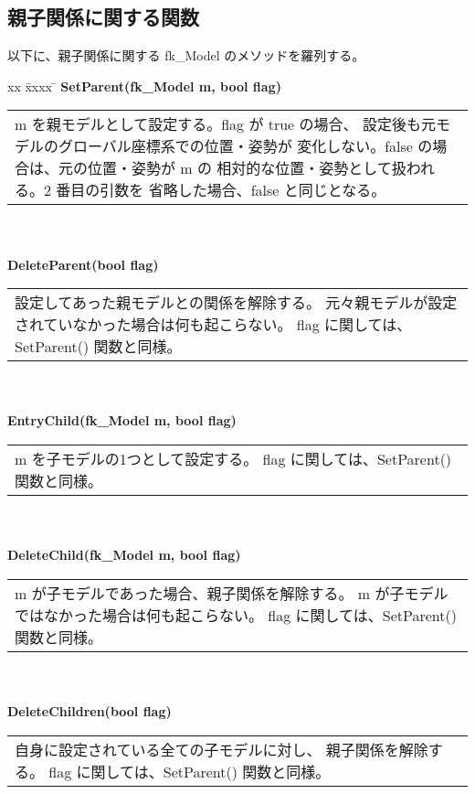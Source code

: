 \subsection{親子関係に関する関数} 
以下に、親子関係に関する fk\_Model のメソッドを羅列する。
\begin{tabbing}
xx \= xxxx \= \kill
\> \textbf{SetParent(fk\_Model m, bool flag)} \\
	\> \> \begin{tabular}{p{15cm}}
		m を親モデルとして設定する。flag が true の場合、
		設定後も元モデルのグローバル座標系での位置・姿勢が
		変化しない。false の場合は、元の位置・姿勢が m の
		相対的な位置・姿勢として扱われる。2 番目の引数を
		省略した場合、false と同じとなる。
	\end{tabular} \\ \\

\> \textbf{DeleteParent(bool flag)} \\
	\> \> \begin{tabular}{p{15cm}}
		設定してあった親モデルとの関係を解除する。
		元々親モデルが設定されていなかった場合は何も起こらない。
		flag に関しては、SetParent() 関数と同様。
	\end{tabular} \\ \\

\> \textbf{EntryChild(fk\_Model m, bool flag)} \\
	\> \> \begin{tabular}{p{15cm}}
		m を子モデルの1つとして設定する。
		flag に関しては、SetParent() 関数と同様。
	\end{tabular} \\ \\

\> \textbf{DeleteChild(fk\_Model m, bool flag)} \\
	\> \> \begin{tabular}{p{15cm}}
		m が子モデルであった場合、親子関係を解除する。
		m が子モデルではなかった場合は何も起こらない。
		flag に関しては、SetParent() 関数と同様。
	\end{tabular} \\ \\

\> \textbf{DeleteChildren(bool flag)} \\
	\> \> \begin{tabular}{p{15cm}}
		自身に設定されている全ての子モデルに対し、
		親子関係を解除する。
		flag に関しては、SetParent() 関数と同様。
	\end{tabular} \\ \\

\end{tabbing}

